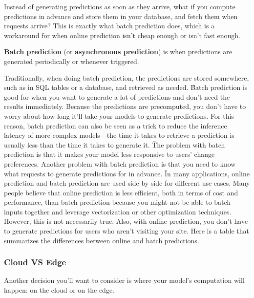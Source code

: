 Instead of generating predictions as soon as they arrive, what if you compute predictions in advance and store them
in your database, and fetch them when requests arrive? This is exactly what batch prediction does, which is a
workaround for when online prediction isn't cheap enough or isn't fast enough.

\textbf{Batch prediction} (or \textbf{asynchronous prediction}) is when predictions are generated periodically or
whenever triggered.
\ed


Traditionally, when doing batch prediction, the predictions are stored somewhere, such as in SQL tables or a database,
and retrieved as needed. \v

Batch prediction is good for when you want to generate a lot of predictions and don't need the results immediately.
Because the predictions are precomputed, you don't have to worry about how long it'll take your models to generate
predictions. For this reason, batch prediction can also be seen as a trick to reduce the inference latency of more
complex models—the time it takes to retrieve a prediction is usually less than the time it takes to generate it. \v

The problem with batch prediction is that it makes your model less responsive to users' change preferences. Another
problem with batch prediction is that you need to know what requests to generate predictions for in advance. \v

In many applications, online prediction and batch prediction are used side by side for different use cases. Many
people believe that online prediction is less efficient, both in terms of cost and performance, than batch prediction
because you might not be able to batch inputs together and leverage vectorization or other optimization techniques.
However, this is not necessarily true. Also, with online prediction, you don't have to generate predictions for users
who aren't visiting your site. Here is a table that summarizes the differences between online and batch predictions.


\subsubsection{Cloud VS Edge}

Another decision you'll want to consider is where your model's computation will happen: on the cloud or on the edge.

